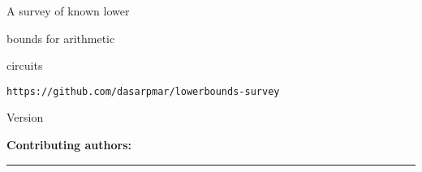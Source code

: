 \documentclass[12pt]{report}
\author{%
    Ramprasad Saptharishi \\
    Tel Aviv University \\
    \texttt{ramprasad@cmi.ac.in}
    }
\makeatletter
\def\printauthor{%
    {\large \@author}}
\makeatother
\begin{document}
\begin{titlepage}
\noindent
\vspace*{1cm}

\titlefont A survey of known lower\par bounds for arithmetic \par circuits\par
\epigraph{\tt https://github.com/dasarpmar/lowerbounds-survey}{Version \currentversion}
\null\vfill
\vspace*{1cm}
\noindent
\hfill
\begin{minipage}{0.50\linewidth}
    \begin{flushright}
      {\Large {\bf Contributing authors:}}

      \vspace*{1cm}

        \printauthor
    \end{flushright}
\end{minipage}
%
\begin{minipage}{0.02\linewidth}
    \rule{1pt}{125pt}
\end{minipage}
\end{titlepage}



\end{document}
